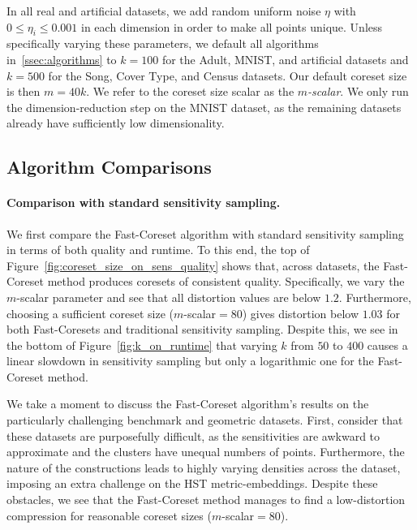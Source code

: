 In all real and artificial datasets, we add random uniform noise $\eta$ with $0 \leq \eta_i \leq 0.001$ in each dimension in order to make all points unique.
Unless specifically varying these parameters, we default all algorithms in~\ref{ssec:algorithms} to $k=100$ for the Adult, MNIST, and artificial datasets and
$k=500$ for the Song, Cover Type, and Census datasets. Our default coreset size is then $m = 40k$. We refer to the coreset size scalar as the \emph{$m$-scalar}.
We only run the dimension-reduction step on the MNIST dataset, as the remaining datasets already have sufficiently low dimensionality.


\subsection{Algorithm Comparisons}
\label{ssec:alg_qualities}


\paragraph*{Comparison with standard sensitivity sampling.}



We first compare the Fast-Coreset algorithm with standard sensitivity sampling in terms of both quality and runtime.  To this end, the top of
Figure~\ref{fig:coreset_size_on_sens_quality} shows that, across datasets, the Fast-Coreset method produces coresets of consistent quality. Specifically, we
vary the $m$-scalar parameter and see that all distortion values are below $1.2$. Furthermore, choosing a sufficient coreset size ($m$-scalar$=80$) gives
distortion below $1.03$ for both Fast-Coresets and traditional sensitivity sampling. Despite this, we see in the bottom of Figure~\ref{fig:k_on_runtime} that
varying $k$ from $50$ to $400$ causes a linear slowdown in sensitivity sampling but only a logarithmic one for the Fast-Coreset method.

We take a moment to discuss the Fast-Coreset algorithm's results on the particularly challenging benchmark and geometric datasets. First, consider that these
datasets are purposefully difficult, as the sensitivities are awkward to approximate and the clusters have unequal numbers of points.
Furthermore, the nature of the constructions leads to highly varying densities across the dataset, imposing an extra challenge on the HST metric-embeddings.
Despite these obstacles, we see that the Fast-Coreset method manages to find a low-distortion compression for reasonable coreset sizes ($m$-scalar$=80$).

